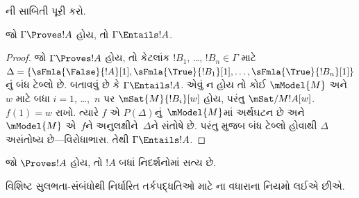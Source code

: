 \begin{prob}
ની સાબિતી પૂરી કરો.
\end{prob}

\begin{cor}
જો $\Gamma \Proves !A$ હોય, તો $\Gamma \Entails !A$.
\end{cor}

\begin{proof}
  જો $\Gamma \Proves !A$ હોય, તો કેટલાંક $!B_1$, \dots,
  $!B_n \in \Gamma$ માટે
  $\Delta = \{\sFmla{\False}{!A}[1], \sFmla{\True}{!B_1}[1],
  \dots, \sFmla{\True}{!B_n}[1]\}$નું બંધ ટેબ્લો છે.
  બતાવવું છે કે $\Gamma \Entails !A$. એવું ન હોય તો કોઈ
  $\mModel{M}$ અને $w$ માટે બધા $i=1$, \dots,~$n$ પર
  $\mSat{M}{!B_i}[w]$ હોય, પરંતુ
  $\mSat/{M}{!A}[w]$. $f(1) = w$ રાખો. ત્યારે $f$ એ
  $P(\Delta)$નું~$\mModel{M}$માં અર્થઘટન છે અને
  $\mModel{M}$ એ~$f$ને અનુલક્ષીને~$\Delta$ને સંતોષે છે.
  પરંતુ  મુજબ બંધ ટેબ્લો
  હોવાથી $\Delta$ અસંતોષ્ય છે—વિરોધાભાસ. તેથી
  $\Gamma \Entails !A$.
\end{proof}

\begin{cor}
જો $\Proves !A$ હોય, તો $!A$ બધાં નિદર્શનોમાં સત્ય છે.
\end{cor}
\endgroup

\begingroup
\makeatletter{}\makeatother


\label{guunit:OLP-0465}


વિશિષ્ટ સુલભતા-સંબંધોથી નિર્ધારિત તર્કપદ્ધતિઓ માટે
ના વધારાના નિયમો લઈએ છીએ.

